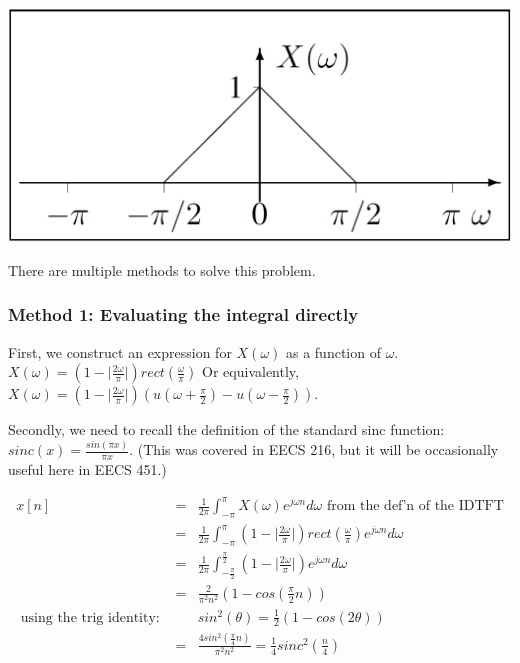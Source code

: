 \documentclass[11pt]{article}
\begin{document}
\includegraphics[scale=0.25]{fessler_hmwk6_p1.png}

{\color{blue}

There are multiple methods to solve this problem.

\subsubsection*{Method 1: Evaluating the integral directly}

First, we construct an expression for $X(\omega)$ as a function of $\omega$. $X(\omega) = \left(1-\big|\frac{2 \omega}{\pi}\big|\right)rect\left(\frac{\omega}{\pi}\right)$ Or equivalently, $X(\omega) = \left(1-\big|\frac{2 \omega}{\pi}\big|\right)\left(u\left(\omega+\frac{\pi}{2}\right)-u\left(\omega-\frac{\pi}{2}\right)\right)$.

Secondly, we need to recall the definition of the standard sinc function: $sinc(x) = \frac{sin(\pi x)}{\pi x}$. (This was covered in EECS 216, but it will be occasionally useful here in EECS 451.)

\begin{eqnarray*}
x[n] &=& \frac{1}{2 \pi} \int_{-\pi}^\pi X(\omega)e^{j\omega n}d\omega \text{ from the def'n of the IDTFT} \\
&=& \frac{1}{2 \pi} \int_{-\pi}^\pi \left(1-\big|\frac{2 \omega}{\pi}\big|\right)rect\left(\frac{\omega}{\pi}\right) e^{j\omega n}d\omega \\
&=& \frac{1}{2 \pi} \int_{-\frac{\pi}{2}}^{\frac{\pi}{2}} \left(1-\big|\frac{2 \omega}{\pi}\big|\right)e^{j\omega n}d\omega \\
&=& \frac{2}{\pi^2 n^2} \left(1-cos\left(\frac{\pi}{2}n\right)\right) \\
\text{ using the trig identity: } && sin^2(\theta) = \frac{1}{2}\left( 1-cos(2\theta) \right) \\
&=& \frac{4 sin^2\left(\frac{\pi}{4}n\right)}{\pi^2 n^2} = \frac{1}{4}sinc^2\left(\frac{n}{4}\right) 
\end{eqnarray*}

}
\end{document}
